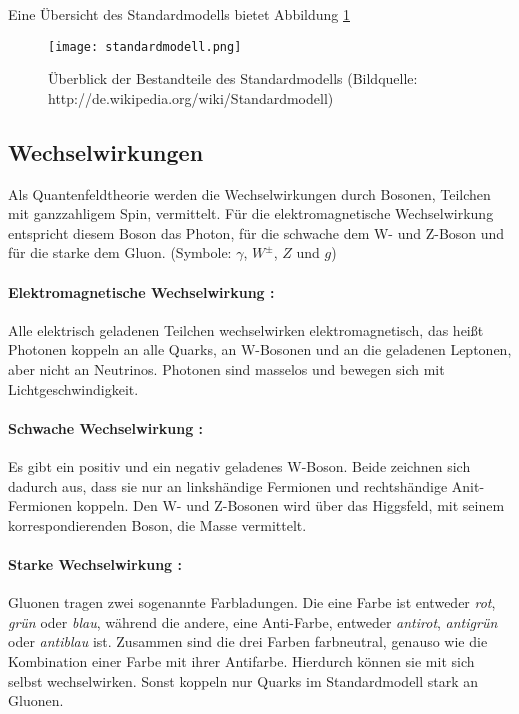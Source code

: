 \documentclass[
a4paper,                                %
twoside,                                %
BCOR1.4cm,                      %
ngerman,                                %
10pt,                           %
headings=normal,                %
headsepline,                    %
clearplainpage, %
final,                                  %
div=14,
parskip=full
]{scrbook}
\begin{document}
Eine \"Ubersicht des Standardmodells bietet Abbildung \ref{SM}

\begin{figure}
	\texttt{[image: standardmodell.png]}
	\caption{\"Uberblick der Bestandteile des Standardmodells (Bildquelle: http://de.wikipedia.org/wiki/Standardmodell)}
	\label{SM}
\end{figure}

\subsection{Wechselwirkungen}

Als Quantenfeldtheorie werden die Wechselwirkungen durch Bosonen, Teilchen mit ganzzahligem Spin, vermittelt. F\"ur die elektromagnetische Wechselwirkung entspricht diesem Boson das Photon, f\"ur die schwache dem W- und Z-Boson und f\"ur die starke dem Gluon.  (Symbole: $ \gamma $, $ W^{\pm} $, $ Z $ und $ g $)

\paragraph*{Elektromagnetische Wechselwirkung :}

Alle elektrisch geladenen Teilchen wechselwirken elektromagnetisch, das hei\ss t Photonen koppeln an alle  Quarks, an W-Bosonen und an die geladenen Leptonen, aber nicht an Neutrinos. Photonen sind masselos und bewegen sich mit Lichtgeschwindigkeit.

\paragraph*{Schwache Wechselwirkung :}

Es gibt ein positiv und ein negativ geladenes W-Boson. Beide zeichnen sich dadurch aus, dass sie nur an linksh\"andige Fermionen und rechtsh\"andige Anit-Fermionen koppeln. Den W- und Z-Bosonen wird \"uber das Higgsfeld, mit seinem korrespondierenden Boson, die Masse vermittelt.

\paragraph*{Starke Wechselwirkung :}

Gluonen tragen zwei sogenannte Farbladungen. Die eine Farbe ist entweder \textit{rot}, \textit{gr\"un} oder \textit{blau}, w\"ahrend die andere, eine Anti-Farbe, entweder \textit{antirot}, \textit{antigr\"un} oder \textit{antiblau} ist. Zusammen sind die drei Farben farbneutral, genauso wie die Kombination einer Farbe mit ihrer Antifarbe. Hierdurch k\"onnen sie mit sich selbst wechselwirken. Sonst koppeln nur Quarks im Standardmodell stark an Gluonen.
\end{document}

